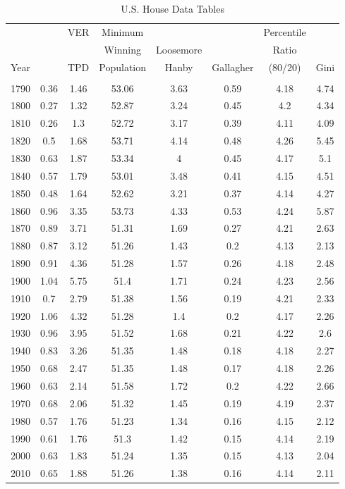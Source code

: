  

\begin{table}[!htbp] \centering 
  \caption{U.S. House Data Tables} 
  \label{tab:app_house} 
\begin{tabular}{c|ccccccc}
 &  & VER & Minimum &  &  & Percentile &  \\ 
  &   &   & Winning & Loosemore &  & Ratio &  \\ 
 Year &  & TPD & Population & Hanby & Gallagher & (80/20) & Gini \\ 
\hline \\[-1.8ex] 
1790 & 0.36 & 1.46 & 53.06 & 3.63 & 0.59 & 4.18 & 4.74 \\
1800 & 0.27 & 1.32 & 52.87 & 3.24 & 0.45 & 4.2 & 4.34 \\
1810 & 0.26 & 1.3 & 52.72 & 3.17 & 0.39 & 4.11 & 4.09 \\
1820 & 0.5 & 1.68 & 53.71 & 4.14 & 0.48 & 4.26 & 5.45 \\
1830 & 0.63 & 1.87 & 53.34 & 4 & 0.45 & 4.17 & 5.1 \\
1840 & 0.57 & 1.79 & 53.01 & 3.48 & 0.41 & 4.15 & 4.51 \\
1850 & 0.48 & 1.64 & 52.62 & 3.21 & 0.37 & 4.14 & 4.27 \\
1860 & 0.96 & 3.35 & 53.73 & 4.33 & 0.53 & 4.24 & 5.87 \\
1870 & 0.89 & 3.71 & 51.31 & 1.69 & 0.27 & 4.21 & 2.63 \\
1880 & 0.87 & 3.12 & 51.26 & 1.43 & 0.2 & 4.13 & 2.13 \\
1890 & 0.91 & 4.36 & 51.28 & 1.57 & 0.26 & 4.18 & 2.48 \\
1900 & 1.04 & 5.75 & 51.4 & 1.71 & 0.24 & 4.23 & 2.56 \\
1910 & 0.7 & 2.79 & 51.38 & 1.56 & 0.19 & 4.21 & 2.33 \\
1920 & 1.06 & 4.32 & 51.28 & 1.4 & 0.2 & 4.17 & 2.26 \\
1930 & 0.96 & 3.95 & 51.52 & 1.68 & 0.21 & 4.22 & 2.6 \\
1940 & 0.83 & 3.26 & 51.35 & 1.48 & 0.18 & 4.18 & 2.27 \\
1950 & 0.68 & 2.47 & 51.35 & 1.48 & 0.17 & 4.18 & 2.26 \\
1960 & 0.63 & 2.14 & 51.58 & 1.72 & 0.2 & 4.22 & 2.66 \\
1970 & 0.68 & 2.06 & 51.32 & 1.45 & 0.19 & 4.19 & 2.37 \\
1980 & 0.57 & 1.76 & 51.23 & 1.34 & 0.16 & 4.15 & 2.12 \\
1990 & 0.61 & 1.76 & 51.3 & 1.42 & 0.15 & 4.14 & 2.19 \\
2000 & 0.63 & 1.83 & 51.24 & 1.35 & 0.15 & 4.13 & 2.04 \\
2010 & 0.65 & 1.88 & 51.26 & 1.38 & 0.16 & 4.14 & 2.11 \\
\end{tabular}
\tabnotes{}
\end{table}

 
